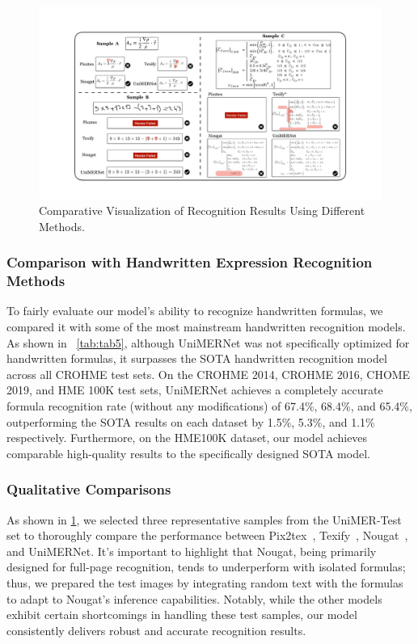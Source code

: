 \documentclass[runningheads]{llncs}
\begin{document}
\begin{figure}[t]
  \centering
	\includegraphics[width=0.95\linewidth]{figures/fig5_visualization.pdf}
    \caption{Comparative Visualization of Recognition Results Using Different Methods.}
  \label{fig:fig5_result}
  \vspace{-5pt}
\end{figure}


\vspace{-5pt}
\subsubsection{Comparison with Handwritten Expression Recognition Methods}

To fairly evaluate our model's ability to recognize handwritten formulas, we compared it with some of the most mainstream handwritten recognition models. As shown in ~\cref{tab:tab5}, although UniMERNet was not specifically optimized for handwritten formulas, it surpasses the SOTA handwritten recognition model across all CROHME test sets. On the CROHME 2014, CROHME 2016, CHOME 2019, and HME 100K test sets, UniMERNet achieves a completely accurate formula recognition rate (without any modifications) of 67.4\%, 68.4\%, and 65.4\%, outperforming the SOTA results on each dataset by 1.5\%, 5.3\%, and 1.1\% respectively. Furthermore, on the HME100K dataset, our model achieves comparable high-quality results to the specifically designed SOTA model.

\vspace{-5pt}
\subsubsection{Qualitative Comparisons}
As shown in \cref{fig:fig5_result},  we selected three representative samples from the UniMER-Test set to thoroughly compare the performance between Pix2tex~\cite{pix2tex2022}, Texify~\cite{texify2023}, Nougat~\cite{blecher2023nougat}, and UniMERNet. It's important to highlight that Nougat, being primarily designed for full-page recognition, tends to underperform with isolated formulas; thus, we prepared the test images by integrating random text with the formulas to adapt to Nougat's inference capabilities. Notably, while the other models exhibit certain shortcomings in handling these test samples, our model consistently delivers robust and accurate recognition results.
\end{document}
